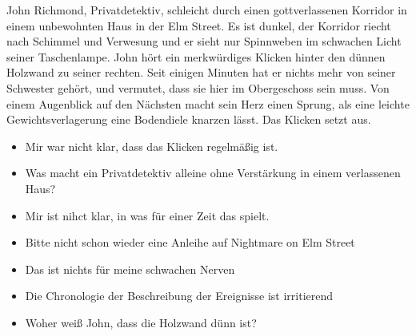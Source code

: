 \documentclass{article}
\begin{document}
John Richmond, Privatdetektiv, schleicht durch einen gottverlassenen Korridor in einem unbewohnten Haus in der Elm Street.
Es ist dunkel, der Korridor riecht nach Schimmel und Verwesung und er sieht nur Spinnweben im schwachen Licht seiner Taschenlampe.
John hört ein merkwürdiges Klicken hinter den dünnen Holzwand zu seiner rechten.
Seit einigen Minuten hat er nichts mehr von seiner Schwester gehört, und vermutet, dass sie hier im Obergeschoss sein muss.
Von einem Augenblick auf den Nächsten macht sein Herz einen Sprung, als eine leichte Gewichtsverlagerung eine Bodendiele knarzen lässt.
Das Klicken setzt aus.
\begin{itemize}
\item Mir war nicht klar, dass das Klicken regelmäßig ist.
\item Was macht ein Privatdetektiv alleine ohne Verstärkung in einem verlassenen Haus?
\item Mir ist nihct klar, in was für einer Zeit das spielt.
\item Bitte nicht schon wieder eine Anleihe auf Nightmare on Elm Street
\item Das ist nichts für meine schwachen Nerven
\item Die Chronologie der Beschreibung der Ereignisse ist irritierend
\item Woher weiß John, dass die Holzwand dünn ist?
\end{itemize}
\end{document}
